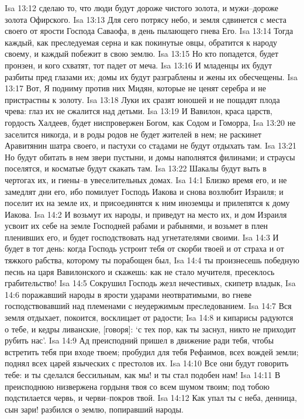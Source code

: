 Isa 13:12  сделаю то, что люди будут дороже чистого золота, и мужи--дороже золота Офирского.
Isa 13:13  Для сего потрясу небо, и земля сдвинется с места своего от ярости Господа Саваофа, в день пылающего гнева Его.
Isa 13:14  Тогда каждый, как преследуемая серна и как покинутые овцы, обратится к народу своему, и каждый побежит в свою землю.
Isa 13:15  Но кто попадется, будет пронзен, и кого схватят, тот падет от меча.
Isa 13:16  И младенцы их будут разбиты пред глазами их; домы их будут разграблены и жены их обесчещены.
Isa 13:17  Вот, Я подниму против них Мидян, которые не ценят серебра и не пристрастны к золоту.
Isa 13:18  Луки их сразят юношей и не пощадят плода чрева: глаз их не сжалится над детьми.
Isa 13:19  И Вавилон, краса царств, гордость Халдеев, будет ниспровержен Богом, как Содом и Гоморра,
Isa 13:20  не заселится никогда, и в роды родов не будет жителей в нем; не раскинет Аравитянин шатра своего, и пастухи со стадами не будут отдыхать там.
Isa 13:21  Но будут обитать в нем звери пустыни, и домы наполнятся филинами; и страусы поселятся, и косматые будут скакать там.
Isa 13:22  Шакалы будут выть в чертогах их, и гиены--в увеселительных домах.
Isa 14:1  Близко время его, и не замедлят дни его, ибо помилует Господь Иакова и снова возлюбит Израиля; и поселит их на земле их, и присоединятся к ним иноземцы и прилепятся к дому Иакова.
Isa 14:2  И возьмут их народы, и приведут на место их, и дом Израиля усвоит их себе на земле Господней рабами и рабынями, и возьмет в плен пленивших его, и будет господствовать над угнетателями своими.
Isa 14:3  И будет в тот день: когда Господь устроит тебя от скорби твоей и от страха и от тяжкого рабства, которому ты порабощен был,
Isa 14:4  ты произнесешь победную песнь на царя Вавилонского и скажешь: как не стало мучителя, пресеклось грабительство!
Isa 14:5  Сокрушил Господь жезл нечестивых, скипетр владык,
Isa 14:6  поражавший народы в ярости ударами неотвратимыми, во гневе господствовавший над племенами с неудержимым преследованием.
Isa 14:7  Вся земля отдыхает, покоится, восклицает от радости;
Isa 14:8  и кипарисы радуются о тебе, и кедры ливанские, [говоря]: `с тех пор, как ты заснул, никто не приходит рубить нас'.
Isa 14:9  Ад преисподний пришел в движение ради тебя, чтобы встретить тебя при входе твоем; пробудил для тебя Рефаимов, всех вождей земли; поднял всех царей языческих с престолов их.
Isa 14:10  Все они будут говорить тебе: и ты сделался бессильным, как мы! и ты стал подобен нам!
Isa 14:11  В преисподнюю низвержена гордыня твоя со всем шумом твоим; под тобою подстилается червь, и черви--покров твой.
Isa 14:12  Как упал ты с неба, денница, сын зари! разбился о землю, попиравший народы.
